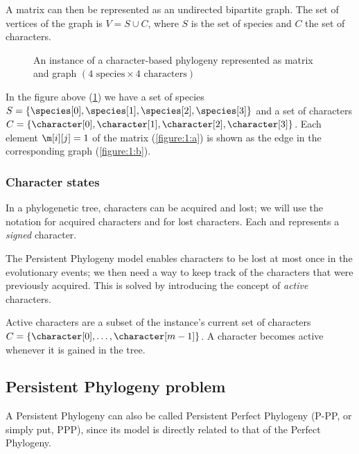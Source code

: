 A matrix \m{} can then be represented as an undirected bipartite graph. The set of vertices of the graph is $V = S \cup C$, where $S$ is the set of species and $C$ the set of characters.

\begin{figure}[h]
  

  \caption{An instance of a character-based phylogeny represented as matrix and graph $(\text{4 species} \times \text{4 characters})$}\label{figure:1}
\end{figure}

In the figure above (\ref{figure:1}) we have a set of species $S = \{ \species[0], \species[1], \species[2], \species[3] \}$ and a set of characters $C = \{ \character[0], \character[1], \character[2], \character[3] \}$.
Each element $\m[i][j] = 1$ of the matrix (\ref{figure:1:a}) is shown as the edge \edge{\species[i]}{\character[j]} in the corresponding graph (\ref{figure:1:b}).

\subsubsection{Character states}\label{section:character-states}


In a phylogenetic tree, characters can be acquired and lost; we will use the notation \character[][+] for acquired characters and \character[][-] for lost characters. Each \character[][+] and \character[][-] represents a \emph{signed} character.

The Persistent Phylogeny model enables characters to be lost at most once in the evolutionary events; we then need a way to keep track of the characters that were previously acquired. This is solved by introducing the concept of  \emph{active} characters.

Active characters are a subset of the instance's current set of characters $C = \{ \character[0], \dots, \character[m-1] \}$.
A character becomes active whenever it is gained in the tree.

\subsection{Persistent Phylogeny problem}\label{section:ppp}


A Persistent Phylogeny can also be called Persistent Perfect Phylogeny (P-PP, or simply put, PPP), since its model is directly related to that of the Perfect Phylogeny.

